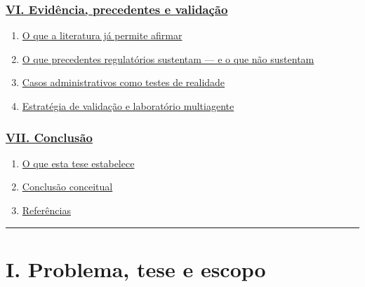 \documentclass[
  a4paper,
]{article}
\providecommand{\tightlist}{%
  \setlength{\itemsep}{0pt}\setlength{\parskip}{0pt}}
\begin{document}
\hypertarget{vi-eviduxeancia-precedentes-e-validauxe7uxe3o}{%
\subsubsection{\texorpdfstring{\protect\hyperlink{vi-evidencia-precedentes-e-validacao}{VI.
Evidência, precedentes e
validação}}{VI. Evidência, precedentes e validação}}\label{vi-eviduxeancia-precedentes-e-validauxe7uxe3o}}

\begin{enumerate}
\def\labelenumi{\arabic{enumi}.}
\setcounter{enumi}{28}
\tightlist
\item
  \protect\hyperlink{29-o-que-a-literatura-ja-permite-afirmar}{O que a
  literatura já permite afirmar}
\item
  \protect\hyperlink{30-o-que-precedentes-regulatorios-sustentam-e-o-que-nao-sustentam}{O
  que precedentes regulatórios sustentam --- e o que não sustentam}
\item
  \protect\hyperlink{31-casos-administrativos-como-testes-de-realidade}{Casos
  administrativos como testes de realidade}
\item
  \protect\hyperlink{32-estrategia-de-validacao-e-laboratorio-multiagente}{Estratégia
  de validação e laboratório multiagente}
\end{enumerate}

\hypertarget{vii-conclusuxe3o}{%
\subsubsection{\texorpdfstring{\protect\hyperlink{vii-conclusao}{VII.
Conclusão}}{VII. Conclusão}}\label{vii-conclusuxe3o}}

\begin{enumerate}
\def\labelenumi{\arabic{enumi}.}
\setcounter{enumi}{32}
\tightlist
\item
  \protect\hyperlink{33-o-que-esta-tese-estabelece}{O que esta tese
  estabelece}
\item
  \protect\hyperlink{34-conclusao-conceitual}{Conclusão conceitual}
\item
  \protect\hyperlink{35-referencias}{Referências}
\end{enumerate}

\begin{center}\rule{0.5\linewidth}{0.5pt}\end{center}

\hypertarget{i-problema-tese-e-escopo}{}

\hypertarget{i-problema-tese-e-escopo-1}{%
\section{I. Problema, tese e escopo}\label{i-problema-tese-e-escopo-1}}
\end{document}

